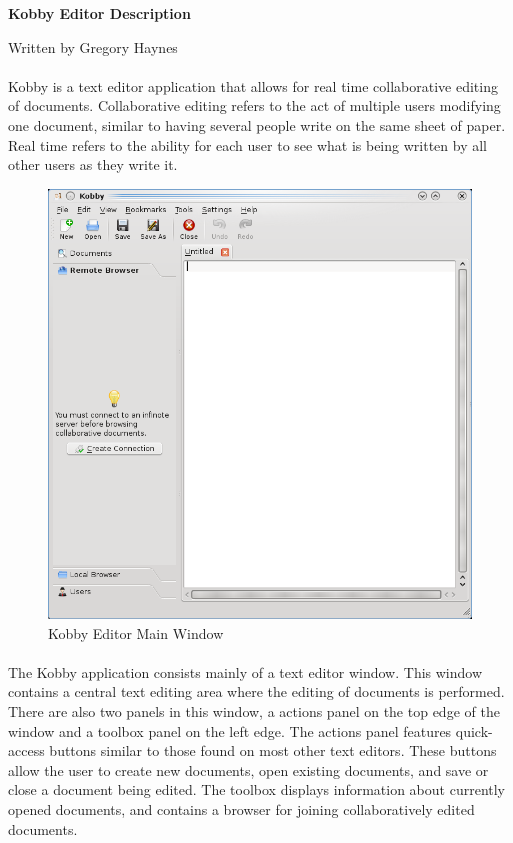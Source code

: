 \documentclass[11pt]{article}
\begin{document}
\centerline {\Large \bf Kobby Editor Description}
\centerline {Written by Gregory Haynes}

\paragraph{}Kobby is a text editor application that allows for real time collaborative editing of documents.  Collaborative editing refers to the act of multiple users modifying one document, similar to having several people write on the same sheet of paper.  Real time refers to the ability for each user to see what is being written by all other users as they write it.

\begin{figure}[tbh]
\begin{center}
\includegraphics[width=.7\textwidth]{kobbymain.png}
\end{center}
\caption{Kobby Editor Main Window}
\end{figure}

\paragraph{}The Kobby application consists mainly of a text editor window.  This window contains a central text editing area where the editing of documents is performed.  There are also two panels in this window, a actions panel on the top edge of the window and a toolbox panel on the left edge.  The actions panel features quick-access buttons similar to those found on most other text editors.  These buttons allow the user to create new documents, open existing documents, and save or close a document being edited.  The toolbox displays information about currently opened documents, and contains a browser for joining collaboratively edited documents.
\end{document}
